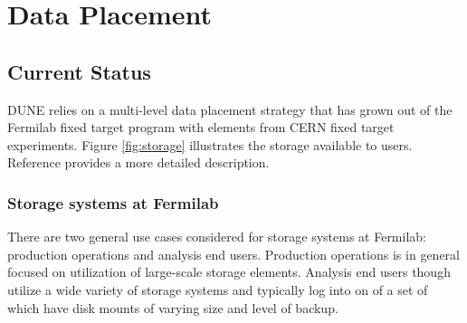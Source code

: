 \documentclass[../main-v1.tex]{subfiles}
\begin{document}
\chapter{Data Placement  }
\label{ch:place}


\section{Current Status}

DUNE relies on a multi-level data placement strategy that has grown out of the Fermilab fixed target program with elements from CERN fixed target experiments.  Figure \ref{fig:storage} illustrates the storage available to users. Reference \cite{bib:storage} provides a more detailed description. 

\subsection{Storage systems at Fermilab}

There are two general use cases considered for storage systems at Fermilab: production operations and analysis end users. Production operations is in general focused on utilization of large-scale storage elements. Analysis end users though utilize a wide variety of storage systems and typically log into on of a set of   which have disk mounts of varying size and level of backup. 
\end{document}

